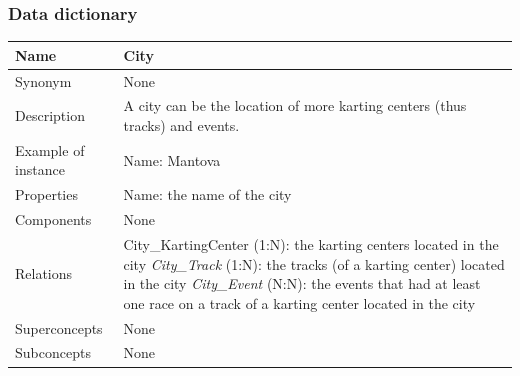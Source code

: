 \documentclass{beamer}
\begin{document}
\begin{frame}
\frametitle{Data dictionary}
\begin{table}
\tiny
\begin{tabular}{|p{2cm}|p{6cm}|}
\hline
Name & \textbf{City} \\
\hline
Synonym & None \\
\hline
Description & A city can be the location of more karting centers (thus tracks)
and events. \\
\hline
Example of instance & 
Name: Mantova \\
\hline
Properties & 
Name: the name of the city \\
\hline
Components & None \\
\hline
Relations &
City\_KartingCenter (1:N): the karting centers located in the city \newline
\textit{City\_Track} (1:N): the tracks (of a karting center) located in the city \newline
\textit{City\_Event} (N:N): the events that had at least one race on a track of a karting center
located in the city \\
\hline
Superconcepts & None \\
\hline
Subconcepts & None \\
\hline
\end{tabular}
\end{table}
\end{frame}
\end{document}
